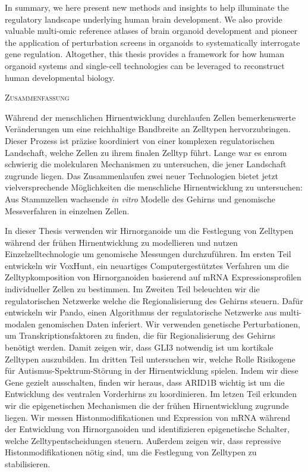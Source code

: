 In summary, we here present new methods and insights to help illuminate the regulatory landscape underlying human brain development. We also provide valuable multi-omic reference atlases of brain organoid development and pioneer the application of perturbation screens in organoids to systematically interrogate gene regulation. Altogether, this thesis provides a framework for how human organoid systems and single-cell technologies can be leveraged to reconstruct human developmental biology.


\clearpage

\begin{center}
    \large\textsc{Zusammenfassung}
\end{center}

Während der menschlichen Hirnentwicklung durchlaufen Zellen bemerkenswerte Veränderungen um eine reichhaltige Bandbreite an Zelltypen hervorzubringen. Dieser Prozess ist präzise koordiniert von einer komplexen regulatorischen Landschaft, welche Zellen zu ihrem finalen Zelltyp führt. Lange war es enrom schwierig die molekularen Mechanismen zu untersuchen, die jener Landschaft zugrunde liegen. Das Zusammenlaufen zwei neuer Technologien bietet jetzt vielversprechende Möglichkeiten die menschliche Hirnentwicklung zu untersuchen: Aus Stammzellen wachsende \textit{in vitro} Modelle des Gehirns und genomische Messverfahren in einzelnen Zellen.

In dieser Thesis verwenden wir Hirnorganoide um die Festlegung von Zelltypen während der frühen Hirnentwicklung zu modellieren und nutzen Einzelzelltechnologie um genomische Messungen durchzuführen. Im ersten Teil entwickeln wir VoxHunt, ein neuartiges Computergestütztes Verfahren um die Zelltypkomposition von Hirnorganoiden basierend auf mRNA Expressionsprofilen individueller Zellen zu bestimmen. Im Zweiten Teil beleuchten wir die regulatorischen Netzwerke welche die Regionalisierung des Gehirns steuern. Dafür entwickeln wir Pando, einen Algorithmus der regulatorische Netzwerke aus multi-modalen genomischen Daten inferiert. Wir verwenden genetische Perturbationen, um Transkriptionsfaktoren zu finden, die für Regionalisierung des Gehirns benötigt werden. Damit zeigen wir, dass GLI3 notwendig ist um kortikale Zelltypen auszubilden. Im dritten Teil untersuchen wir, welche Rolle Risikogene für Autismus-Spektrum-Störung in der Hirnentwicklung spielen. Indem wir diese Gene gezielt ausschalten, finden wir heraus, dass ARID1B wichtig ist um die Entwicklung des ventralen Vorderhirns zu koordinieren. Im letzen Teil erkunden wir die epigenetischen Mechanismen die der frühen Hirnentwicklung zugrunde liegen. Wir messen Histonmodifikationen und Expression von mRNA während der Entwicklung von Hirnorganoiden und identifizieren epigenetische Schalter, welche Zelltypentscheidungen steuern. Außerdem zeigen wir, dass repressive Histonmodifikationen nötig sind, um die Festlegung von Zelltypen zu stabilisieren. 

